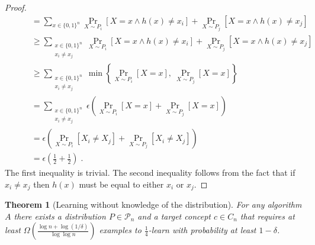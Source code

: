 \documentclass[12pt]{article}
\newtheorem{theorem}[proposition]{Theorem}
\renewcommand{\P}{\mathcal{P}}
\begin{document}
\begin{proof}
\begin{align*}
& \qquad = \sum_{x \in \{0,1\}^n} \Pr_{X \sim P_i}[X = x \wedge h(x) \neq x_i] + \Pr_{X \sim P_j}[X = x \wedge h(x) \neq x_j] \\
& \qquad \ge \sum_{\substack{x \in \{0,1\}^n \\ x_i \neq x_j}} \Pr_{X \sim P_i}[X = x \wedge h(x) \neq x_i] + \Pr_{X \sim P_j}[X = x \wedge h(x) \neq x_j] \\
& \qquad \ge \sum_{\substack{x \in \{0,1\}^n \\ x_i \neq x_j}} \min \left\{ \Pr_{X \sim P_i}[X = x], \ \Pr_{X \sim P_j}[X = x] \right\} \\
& \qquad = \sum_{\substack{x \in \{0,1\}^n \\ x_i \neq x_j}} \epsilon \left( \Pr_{X \sim P_i}[X = x] + \Pr_{X \sim P_j}[X = x] \right) \\
& \qquad = \epsilon \left( \Pr_{X \sim P_i}[X_i \neq X_j] + \Pr_{X \sim P_j}[X_i \neq X_j] \right) \\
& \qquad = \epsilon \left( \frac{1}{2} + \frac{1}{2} \right) \; .
\end{align*}
The first inequality is trivial. The second inequality follows from the fact that
if $x_i \neq x_j$ then $h(x)$ must be equal to either $x_i$ or $x_j$.
\end{proof}



\begin{theorem}[Learning without knowledge of the distribution]
For any algorithm $A$ there exists a distribution $P \in \P_n$
and a target concept $c \in C_n$ that requires at least $\Omega \left(\frac{\log n + \log(1/\delta)}{\log \log n} \right)$
examples to $\frac{1}{4}$-learn with probability at least $1 - \delta$.
\end{theorem}
\end{document}
